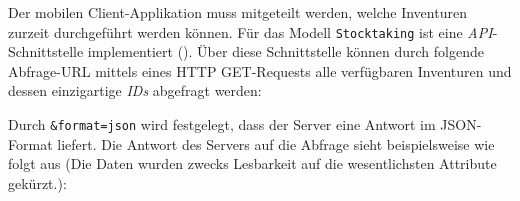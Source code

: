 Der mobilen Client-Applikation muss mitgeteilt werden, welche Inventuren
zurzeit durchgeführt werden können. Für das Modell \texttt{Stocktaking}
ist eine
\emph{API}-Schnittstelle
implementiert (). Über diese Schnittstelle können
durch folgende Abfrage-URL mittels eines HTTP GET-Requests
\cite{rest-http-methods} alle verfügbaren Inventuren und dessen
einzigartige \emph{IDs}
abgefragt werden:

\begin{Shaded}
\begin{Highlighting}[]
\NormalTok{/}\KeywordTok{\&}\KeywordTok{\&}
\end{Highlighting}
\end{Shaded}

Durch \texttt{\&format=json} wird festgelegt, dass der Server eine
Antwort im JSON-Format \cite{json-format-doku} liefert. Die Antwort des
Servers auf die Abfrage sieht beispielsweise wie folgt aus (Die Daten
wurden zwecks Lesbarkeit auf die wesentlichsten Attribute gekürzt.):

\begin{Shaded}
\begin{Highlighting}[]
\OtherTok{[}
    \FunctionTok{\{}
        \FunctionTok{:} \FunctionTok{,}
        \FunctionTok{:} \FunctionTok{,}
        \FunctionTok{:} \FunctionTok{,}
        \FunctionTok{:} \FunctionTok{,}
    \FunctionTok{\}}\OtherTok{,}
    \FunctionTok{\{}
        \FunctionTok{:} \FunctionTok{,}
        \FunctionTok{:} \FunctionTok{,}
        \FunctionTok{:} \FunctionTok{,}
        \FunctionTok{:} \FunctionTok{,}
    \FunctionTok{\}}
\OtherTok{]}
\end{Highlighting}
\end{Shaded}

